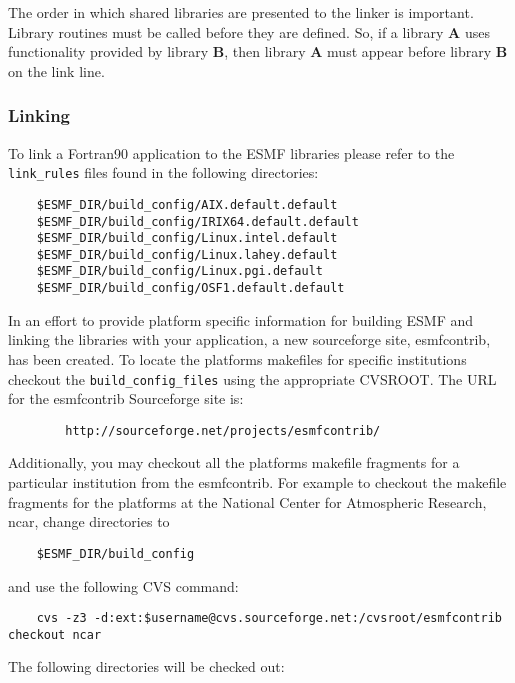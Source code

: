 The order in which shared libraries are presented to 
the linker is important. Library routines must be called before they are 
defined. So, if a library {\bf A} uses functionality provided by library 
{\bf B}, then library {\bf A} must appear before library {\bf B} on the 
link line. 

\subsubsection{Linking}

To link a Fortran90 application to the ESMF libraries please 
refer to the {\tt link\_rules} files found in the following directories:

\begin{verbatim}
	$ESMF_DIR/build_config/AIX.default.default
	$ESMF_DIR/build_config/IRIX64.default.default
	$ESMF_DIR/build_config/Linux.intel.default
	$ESMF_DIR/build_config/Linux.lahey.default
	$ESMF_DIR/build_config/Linux.pgi.default
	$ESMF_DIR/build_config/OSF1.default.default
\end{verbatim}

In an effort to provide platform specific information for building ESMF 
and linking the libraries with your application, a new sourceforge 
site, esmfcontrib, has been created.
To locate the platforms makefiles for specific institutions checkout 
the {\tt build\_config\_files} using the appropriate CVSROOT.
The URL for the esmfcontrib Sourceforge site is:

\begin{verbatim}
        http://sourceforge.net/projects/esmfcontrib/
\end{verbatim}

Additionally, you may checkout all the platforms makefile fragments 
for a particular institution from the esmfcontrib. For example to 
checkout the makefile fragments for the platforms at the
National Center for Atmospheric Research, ncar, change directories to

\begin{verbatim}
 	$ESMF_DIR/build_config
\end{verbatim}

and use the following CVS command:

\begin{verbatim}
	cvs -z3 -d:ext:$username@cvs.sourceforge.net:/cvsroot/esmfcontrib checkout ncar
\end{verbatim}

The following directories will be checked out:

